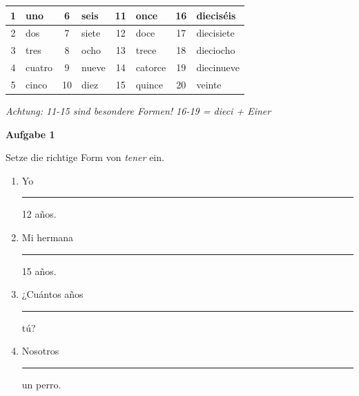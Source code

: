 \documentclass[11pt, a4paper]{article}
\newcommand{\fachfarbe}{spanisch}
\newcommand{\punktebox}[1]{\hfill\fbox{\small \_/#1}}
\newcommand{\luecke}[1]{\rule{#1}{0.4pt}}
\newenvironment{aufgabe}[1]{%
    \needspace{5\baselineskip}%
    \nopagebreak[4]%
    \vspace{10pt}
    \noindent\textbf{\textcolor{\fachfarbe}{Aufgabe #1}}
    \nopagebreak[4]%
    \vspace{5pt}
    \nopagebreak[4]%
    \begin{list}{}{\leftmargin=0pt}
    \item[]
}{%
    \end{list}
}
\begin{document}

\begin{merkkasten}

\begin{center}
\begin{tabular}{|c|l|c|l|c|l|c|l|}
\hline
1 & uno & 6 & seis & 11 & once & 16 & dieciséis \\
\hline
2 & dos & 7 & siete & 12 & doce & 17 & diecisiete \\
\hline
3 & tres & 8 & ocho & 13 & trece & 18 & dieciocho \\
\hline
4 & cuatro & 9 & nueve & 14 & catorce & 19 & diecinueve \\
\hline
5 & cinco & 10 & diez & 15 & quince & 20 & veinte \\
\hline
\end{tabular}
\end{center}

\vspace{0.3em}
\textit{Achtung: 11-15 sind besondere Formen! 16-19 = dieci + Einer}
\end{merkkasten}

\vspace{15pt}


\begin{aufgabe}{1}
Setze die richtige Form von \textit{tener} ein. \punktebox{4}
\end{aufgabe}

\begin{enumerate}[label=\alph*)]
    \item Yo \luecke{2.5cm} 12 años.
    \item Mi hermana \luecke{2.5cm} 15 años.
    \item ¿Cuántos años \luecke{2.5cm} tú?
    \item Nosotros \luecke{2.5cm} un perro.
\end{enumerate}

\vspace{15pt}

\end{document}

